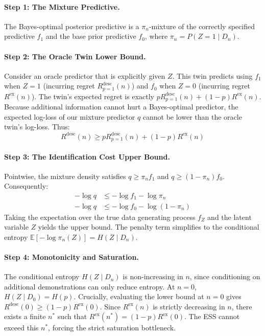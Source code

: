 \documentclass{article}
\begin{document}
\paragraph{Step 1: The Mixture Predictive.}
The Bayes-optimal posterior predictive is a $\pi_n$-mixture of the correctly specified predictive $f_1$ and the base prior predictive $f_0$, where $\pi_n = P(Z=1 \mid D_n)$. 

\paragraph{Step 2: The Oracle Twin Lower Bound.}
Consider an oracle predictor that is explicitly given $Z$. This twin predicts using $f_1$ when $Z=1$ (incurring regret $R^{\text{desc}}_{p=1}(n)$) and $f_0$ when $Z=0$ (incurring regret $R^{\text{ex}}(n)$). The twin's expected regret is exactly $p R^{\text{desc}}_{p=1}(n) + (1-p) R^{\text{ex}}(n)$.
Because additional information cannot hurt a Bayes-optimal predictor, the expected log-loss of our mixture predictor $q$ cannot be lower than the oracle twin's log-loss. Thus:
\begin{equation}
    R^{\text{desc}}(n) \ge p R^{\text{desc}}_{p=1}(n) + (1-p) R^{\text{ex}}(n)
\end{equation}

\paragraph{Step 3: The Identification Cost Upper Bound.}
Pointwise, the mixture density satisfies $q \ge \pi_n f_1$ and $q \ge (1-\pi_n) f_0$. Consequently:
\begin{align}
    -\log q &\le -\log f_1 - \log \pi_n \\
    -\log q &\le -\log f_0 - \log(1-\pi_n)
\end{align}
Taking the expectation over the true data generating process $f_Z$ and the latent variable $Z$ yields the upper bound. The penalty term simplifies to the conditional entropy $\mathbb{E}[-\log \pi_n(Z)] = H(Z \mid D_n)$.

\paragraph{Step 4: Monotonicity and Saturation.}
The conditional entropy $H(Z \mid D_n)$ is non-increasing in $n$, since conditioning on additional demonstrations can only reduce entropy. At $n=0$, $H(Z \mid D_0) = H(p)$. 
Crucially, evaluating the lower bound at $n=0$ gives $R^{\text{desc}}(0) \ge (1-p)R^{\text{ex}}(0)$. Since $R^{\text{ex}}(n)$ is strictly decreasing in $n$, there exists a finite $n^*$ such that $R^{\text{ex}}(n^*) = (1-p)R^{\text{ex}}(0)$. The ESS cannot exceed this $n^*$, forcing the strict saturation bottleneck.
\end{document}
